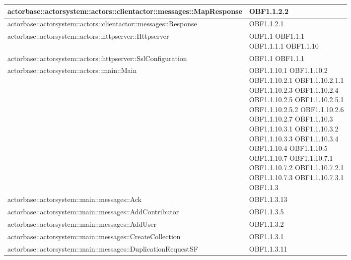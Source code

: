 \documentclass{scalatekids-article}
\begin{document}
\begin{longtable}[H]{|p{12cm}|p{5.5cm}|}
  \hline
  actorbase::actorsystem::actors::clientactor::messages::MapResponse & \multiLineCell[t]{OBF1.1.2.2\\}\\
  \hline
  actorbase::actorsystem::actors::clientactor::messages::Response & \multiLineCell[t]{OBF1.1.2.1\\}\\
  \hline
  actorbase::actorsystem::actors::httpserver::Httpserver & \multiLineCell[t]{OBF1.1 OBF1.1.1\\OBF1.1.1.1 OBF1.1.10\\}\\
  \hline
  actorbase::actorsystem::actors::httpserver::SslConfiguration & \multiLineCell[t]{OBF1.1 OBF1.1.1\\}\\
  \hline
  actorbase::actorsystem::actors::main::Main & \multiLineCell[t]{OBF1.1.10.1 OBF1.1.10.2\\OBF1.1.10.2.1 OBF1.1.10.2.1.1\\OBF1.1.10.2.3 OBF1.1.10.2.4\\OBF1.1.10.2.5 OBF1.1.10.2.5.1\\OBF1.1.10.2.5.2 OBF1.1.10.2.6\\OBF1.1.10.2.7 OBF1.1.10.3\\OBF1.1.10.3.1 OBF1.1.10.3.2\\OBF1.1.10.3.3 OBF1.1.10.3.4\\OBF1.1.10.4 OBF1.1.10.5\\OBF1.1.10.7 OBF1.1.10.7.1\\OBF1.1.10.7.2 OBF1.1.10.7.2.1\\OBF1.1.10.7.3 OBF1.1.10.7.3.1\\OBF1.1.3}\\
  \hline
  actorbase::actorsystem::main::messages::Ack & \multiLineCell[t]{OBF1.1.3.13\\}\\
  \hline
  actorbase::actorsystem::main::messages::AddContributor & \multiLineCell[t]{OBF1.1.3.5\\}\\
  \hline
  actorbase::actorsystem::main::messages::AddUser & \multiLineCell[t]{OBF1.1.3.2\\}\\
  \hline
  actorbase::actorsystem::main::messages::CreateCollection & \multiLineCell[t]{OBF1.1.3.1\\}\\
  \hline
  actorbase::actorsystem::main::messages::DuplicationRequestSF & \multiLineCell[t]{OBF1.1.3.11\\}\\

\end{longtable}
\end{document}

